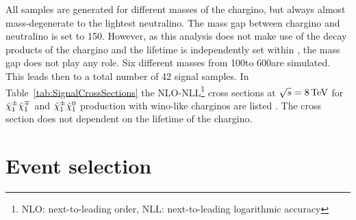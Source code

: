 All samples are generated for different masses of the chargino, but always almost mass-degenerate to the lightest neutralino.
The mass gap between chargino and neutralino is set to 150\mev.
However, as this analysis does not make use of the decay products of the chargino and the lifetime is independently set within \geant, the mass gap does not play any role.
Six different masses from 100\gev to 600\gev are simulated.
This leads then to a total number of 42 signal samples.
In Table~\ref{tab:SignalCrossSections} the NLO-NLL\footnote{NLO: next-to-leading order, NLL: next-to-leading logarithmic accuracy} cross sections at $\sqrt{s}=8\,\text{Te}\kern-0.06667em\text{V}$ for $\tilde{\chi}^{\pm}_{1}\tilde{\chi}^{\mp}_{1}$ and $\tilde{\chi}^{\pm}_{1}\tilde{\chi}^{0}_{1}$ production 
with wino-like charginos are listed \cite{bib:SignalCrossSection_2012,bib:SignalCrossSection_2013}.
The cross section does not dependent on the lifetime of the chargino.
\renewcommand{\arraystretch}{1.5}
\begin{table}[h]
\centering
\caption{Simulated signal mass points with corresponding cross sections for wino-like charginos.}
\label{tab:SignalCrossSections}
\end{table}  

\chapter{Event selection}
\label{sec:EventSelection}

